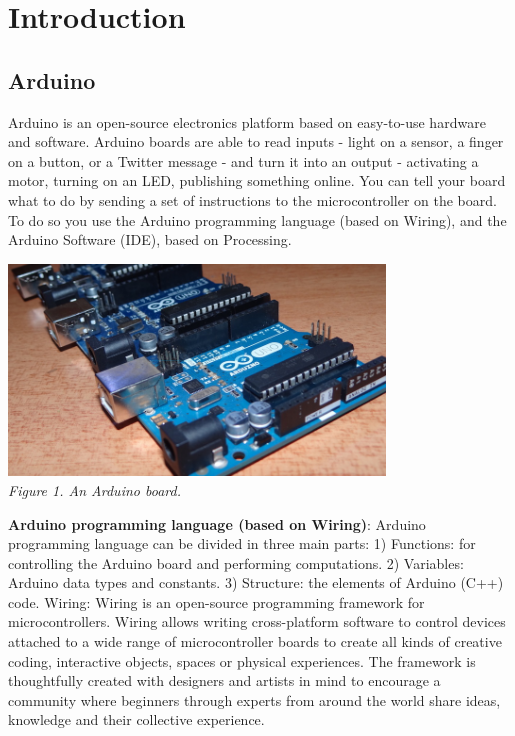 \documentclass[a4paper]{article}
\begin{document}

\newpage
\tableofcontents

\newpage
\section{Introduction}

\subsection{Arduino}
Arduino is an open-source electronics platform based on easy-to-use hardware and software. Arduino boards are able to read inputs - light on a sensor, a finger on a button, or a Twitter message - and turn it into an output - activating a motor, turning on an LED, publishing something online. You can tell your board what to do by sending a set of instructions to the microcontroller on the board. To do so you use the Arduino programming language (based on Wiring), and the Arduino Software (IDE), based on Processing.
\medskip
\begin{center}
    \includegraphics[width=10cm]{pictures/1.jpg}\\
    \textit{Figure 1. An Arduino board.}\\
\end{center}
\medskip
\textbf{Arduino programming language (based on Wiring)}: Arduino programming language can be divided in three main parts:
1) Functions: for controlling the Arduino board and performing computations.
2) Variables: Arduino data types and constants.
3) Structure: the elements of Arduino (C++) code.
Wiring: Wiring is an open-source programming framework for microcontrollers.
Wiring allows writing cross-platform software to control devices attached to a wide range of microcontroller boards to create all kinds of creative coding, interactive objects, spaces or physical experiences. The framework is thoughtfully created with designers and artists in mind to encourage a community where beginners through experts from around the world share ideas, knowledge and their collective experience.\bigskip\\
\end{document}
